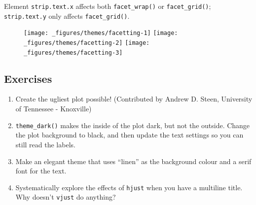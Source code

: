 Element \texttt{strip.text.x} affects both \texttt{facet\_wrap()} or
\texttt{facet\_grid()}; \texttt{strip.text.y} only affects
\texttt{facet\_grid()}.

\begin{Shaded}
\begin{Highlighting}[]
\StringTok{ }\NormalTok{(} \NormalTok{:}\NormalTok{, } \NormalTok{:}\NormalTok{, } \NormalTok{(}\NormalTok{, }\NormalTok{, }\NormalTok{, }\NormalTok{))}
\StringTok{ }\StringTok{ }\NormalTok{() +}\StringTok{ }

\StringTok{ }\NormalTok{(} \NormalTok{(}\NormalTok{, }\NormalTok{))}
\StringTok{ }\NormalTok{(}
   \NormalTok{(} \NormalTok{, } \NormalTok{, } \NormalTok{),}
   \NormalTok{(} \NormalTok{)}
\NormalTok{)}
\end{Highlighting}
\end{Shaded}

\begin{figure}[H]
  \texttt{[image: \_figures/themes/facetting-1]}%
  \texttt{[image: \_figures/themes/facetting-2]}%
  \texttt{[image: \_figures/themes/facetting-3]}
\end{figure}

\subsection{Exercises}

\begin{enumerate}
\def\labelenumi{\arabic{enumi}.}
\item
  Create the ugliest plot possible! (Contributed by Andrew D. Steen,
  University of Tennessee - Knoxville)
\item
  \texttt{theme\_dark()} makes the inside of the plot dark, but not the
  outside. Change the plot background to black, and then update the text
  settings so you can still read the labels.
\item
  Make an elegant theme that uses ``linen'' as the background colour and
  a serif font for the text.
\item
  Systematically explore the effects of \texttt{hjust} when you have a
  multiline title. Why doesn't \texttt{vjust} do anything?
\end{enumerate}

